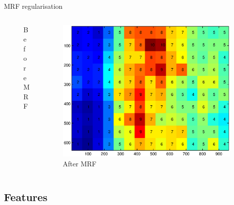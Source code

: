\documentclass[11pt)]{beamer}
\begin{document}
\begin{frame}{MRF regularisation}
\begin{columns}[t]
\begin{column}{.33\textwidth}
\begin{figure}[ht]
			\caption{Before MRF}
		\end{figure}
	\end{column}
	\begin{column}{.33\textwidth}
		\begin{figure}[ht]
			\centering
			\includegraphics[width=\textwidth]{mrf_after.eps}
			\caption{After MRF}
		\end{figure}
	\end{column}
\end{columns}
\end{frame}
\subsection{Features}

\end{document}
